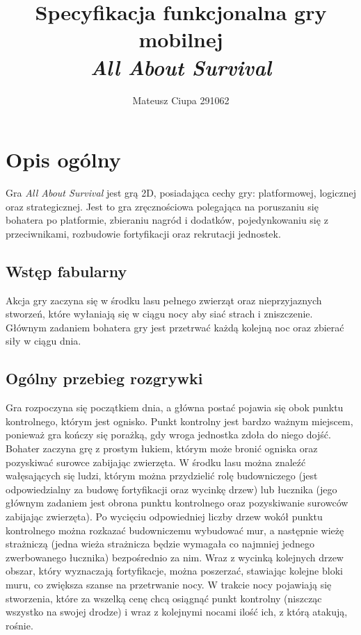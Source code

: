 \documentclass[12pt, a4paper]{article}
\author{Mateusz Ciupa 291062}
\title{Specyfikacja funkcjonalna gry mobilnej \\\textit{All About Survival}}
\begin{document}
\maketitle
\tableofcontents

\section{Opis ogólny}
Gra \textit{All About Survival} jest grą 2D, posiadająca cechy gry: 
platformowej, logicznej oraz strategicznej. Jest to gra zręcznościowa 
polegająca na poruszaniu się bohatera po platformie, zbieraniu nagród i 
dodatków, pojedynkowaniu się z przeciwnikami, rozbudowie fortyfikacji oraz 
rekrutacji jednostek. 

\subsection{Wstęp fabularny}
Akcja gry zaczyna się w środku lasu pełnego zwierząt oraz nieprzyjaznych 
stworzeń, które wyłaniają się w ciągu nocy aby siać strach i zniszczenie. 
Głównym zadaniem bohatera gry jest przetrwać każdą kolejną noc oraz zbierać 
siły w ciągu dnia.

\subsection{Ogólny przebieg rozgrywki}

Gra rozpoczyna się początkiem dnia, a główna postać pojawia się obok punktu 
kontrolnego, którym jest ognisko. Punkt kontrolny jest bardzo ważnym 
miejscem, ponieważ gra kończy się porażką, gdy wroga jednostka zdoła do niego 
dojść. Bohater zaczyna grę z prostym łukiem, którym może bronić ogniska oraz 
pozyskiwać surowce zabijając zwierzęta. W środku lasu można znaleźć 
wałęsających się ludzi, którym można przydzielić rolę budowniczego (jest 
odpowiedzialny za budowę fortyfikacji oraz wycinkę drzew) lub łucznika (jego 
głównym zadaniem jest obrona punktu kontrolnego oraz pozyskiwanie surowców 
zabijając zwierzęta). Po wycięciu odpowiedniej liczby drzew wokół punktu 
kontrolnego można rozkazać budowniczemu wybudować mur, a następnie wieżę 
strażniczą (jedna wieża strażnicza będzie wymagała co najmniej jednego 
zwerbowanego łucznika) bezpośrednio za nim. Wraz z wycinką kolejnych drzew 
obszar, który wyznaczają fortyfikacje, można poszerzać, stawiając kolejne 
bloki muru, co zwiększa szanse na przetrwanie nocy. W trakcie nocy pojawiają 
się stworzenia, które za wszelką cenę chcą osiągnąć punkt kontrolny (niszcząc 
wszystko na swojej drodze) i wraz z kolejnymi nocami ilość ich, z którą 
atakują, rośnie. 
\end{document}
